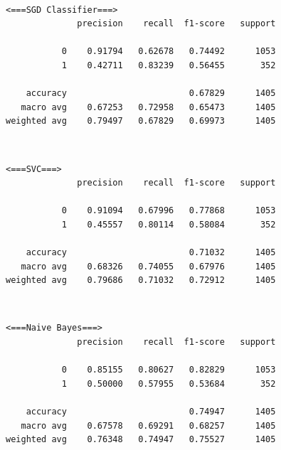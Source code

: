 \documentclass[11pt]{article}
\begin{document}
    \begin{center}
    \end{center}
    { \hspace*{\fill} \\}
    
    \begin{Verbatim}[commandchars=\\\{\}]
 <===SGD Classifier===>
              precision    recall  f1-score   support

           0    0.91794   0.62678   0.74492      1053
           1    0.42711   0.83239   0.56455       352

    accuracy                        0.67829      1405
   macro avg    0.67253   0.72958   0.65473      1405
weighted avg    0.79497   0.67829   0.69973      1405

    \end{Verbatim}

    \begin{center}
    \end{center}
    { \hspace*{\fill} \\}
    
    \begin{Verbatim}[commandchars=\\\{\}]
 <===SVC===>
              precision    recall  f1-score   support

           0    0.91094   0.67996   0.77868      1053
           1    0.45557   0.80114   0.58084       352

    accuracy                        0.71032      1405
   macro avg    0.68326   0.74055   0.67976      1405
weighted avg    0.79686   0.71032   0.72912      1405

    \end{Verbatim}

    \begin{center}
    \end{center}
    { \hspace*{\fill} \\}
    
    \begin{Verbatim}[commandchars=\\\{\}]
 <===Naive Bayes===>
              precision    recall  f1-score   support

           0    0.85155   0.80627   0.82829      1053
           1    0.50000   0.57955   0.53684       352

    accuracy                        0.74947      1405
   macro avg    0.67578   0.69291   0.68257      1405
weighted avg    0.76348   0.74947   0.75527      1405

    \end{Verbatim}
\end{document}
